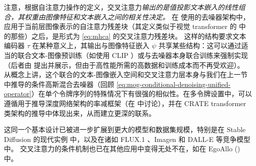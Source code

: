 \documentclass[../../book-main.tex]{subfiles}
\begin{document}
注意，根据自注意力操作的定义，交叉注意力\textit{输出的是值投影文本嵌入的线性组合，其权重由图像特征和文本嵌入之间的相关性决定。}
在 \textcite{rombach2022high} 使用的去噪器架构中，应用于当前层图像表示的自注意力残差块（其定义类似于视觉 transformer 的  中的那些）之后，是形式为 \eqref{eq:mhca} 的交叉注意力残差块。
这样的结构要求文本编码器 $\tau$ 在某种意义上，其输出与图像特征嵌入 $\psi$ 共享某些结构：这可以通过适当的联合文本-图像预训练（如使用 CLIP \cite{Radford2021-ir}）或与去噪器本身联合训练来强制实现（后者由 \textcite{rombach2022high} 提出并展示，但由于高性能所需的高数据和训练成本而不再受欢迎）。
从概念上讲，这个联合的文本-图像嵌入空间和交叉注意力层本身与我们在上一节中推导的条件高斯混合去噪器（回顾 \eqref{eq:mog-conditional-denoising-unified-operator}）在单个令牌序列的特殊情况下有很强的相似性。在多令牌设置中，可以遵循用于推导深度网络架构的率减框架（在  中讨论），并在 CRATE transformer 类架构的推导中体现出来，从而建立更深的联系。

这同一个基本设计已被进一步扩展到更大的模型和数据集规模，特别是在 Stable Diffusion 的现代实例 \cite{DBLP:conf/icml/EsserKBEMSLLSBP24} 中，以及在诸如 FLUX.1 \cite{Labs2025-fb}、Imagen \cite{Saharia2022-na} 和 DALL-E \cite{Ramesh2022-nu} 等竞争模型中。
交叉注意力的条件机制也已在其他应用中变得无处不在，如在 EgoAllo () 中。


%
\end{document}
